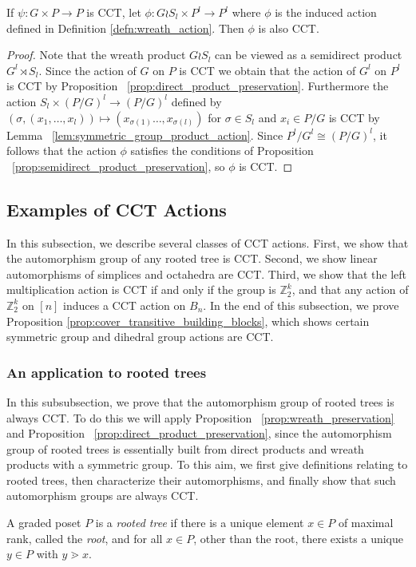 \documentclass[smallextended]{svjour3}       %
\numberwithin{equation}{section}
\newcommand\ssec{\subsection}
\newcommand\sssec{\subsubsection}
\begin{document}
\begin{proposition}
\label{prop:wreath_preservation}
If $\psi\colon G\times P \rightarrow P$ is CCT, let $\phi\colon G\wr S_l \times P^l \rightarrow P^l$ where $\phi$ is the induced action defined in Definition \ref{defn:wreath_action}. Then $\phi$ is also CCT.
\end{proposition}
\begin{proof}
Note that the wreath product $G \wr S_l$ can be viewed as a semidirect product $G^l \rtimes S_l$. Since the action of $G$ on $P$ is CCT we obtain that the action of $G^l$ on $P^l$ is CCT by Proposition ~\ref{prop:direct_product_preservation}.  Furthermore the action $S_l \times (P/G)^l \rightarrow (P/G)^l$ defined by $(\sigma ,(x_1,\ldots, x_l)) \mapsto (x_{\sigma(1)}\ldots, x_{\sigma(l)})$ for $\sigma \in S_l$ and $x_i \in P/G$ is CCT by Lemma ~\ref{lem:symmetric_group_product_action}.  Since $P^l/G^l \cong (P/G)^l$, it follows that the action $\phi$ satisfies the conditions of Proposition ~\ref{prop:semidirect_product_preservation}, so $\phi$ is CCT.
\end{proof}



\ssec{Examples of CCT Actions}\label{ssec:CCT_examples}

In this subsection, we describe several classes of CCT actions. First, we show that the automorphism group of any rooted tree is CCT. Second, we show linear automorphisms of simplices and octahedra are CCT. Third, we show that the left multiplication action is CCT if and only if the group is $\mathbb Z_2^k$, and that any action of $\mathbb Z_2^k$ on $[n]$ induces a CCT action on $B_n$. In the end of this subsection, we prove Proposition \ref{prop:cover_transitive_building_blocks}, which shows certain symmetric group and dihedral group actions are CCT.

\sssec{An application to rooted trees}
\label{ssec:rooted_trees}
In this subsubsection, we prove that the automorphism group of rooted trees is always CCT. To do this we will apply Proposition ~\ref{prop:wreath_preservation} and Proposition ~\ref{prop:direct_product_preservation}, since the automorphism group of rooted trees is essentially built from direct products and wreath products with a symmetric group. To this aim, we first give definitions relating to rooted trees, then characterize their automorphisms, and finally show that such automorphism groups are always CCT.

\begin{definition}
A graded poset $P$ is a {\it rooted tree} if there is a unique element $x \in P$ of maximal rank, called the {\it root}, and for all $x \in P$, other than the root, there exists a unique $y \in P$ with $y \gtrdot x$.
\end{definition}
\end{document}
